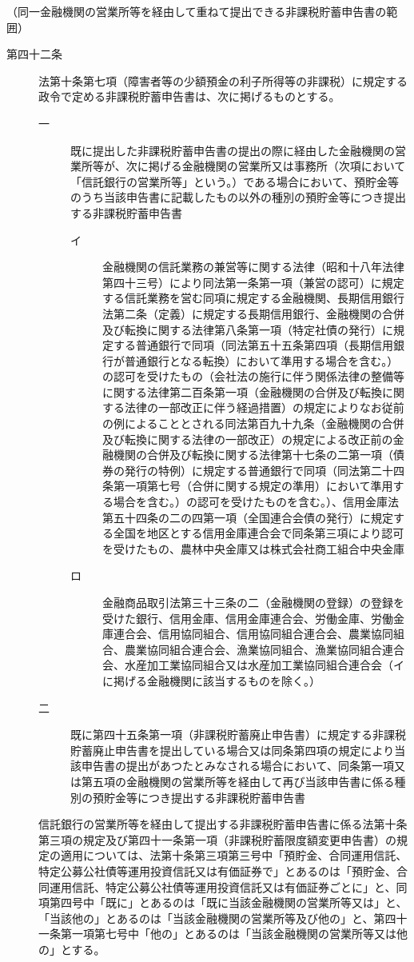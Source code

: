 \documentclass[twocolumn,a4j,10pt]{ltjtarticle}
\begin{document}
\noindent\hspace{10pt}（同一金融機関の営業所等を経由して重ねて提出できる非課税貯蓄申告書の範囲）
\begin{description}
\item[第四十二条]法第十条第七項（障害者等の少額預金の利子所得等の非課税）に規定する政令で定める非課税貯蓄申告書は、次に掲げるものとする。
\begin{description}
\item[一]既に提出した非課税貯蓄申告書の提出の際に経由した金融機関の営業所等が、次に掲げる金融機関の営業所又は事務所（次項において「信託銀行の営業所等」という。）である場合において、預貯金等のうち当該申告書に記載したもの以外の種別の預貯金等につき提出する非課税貯蓄申告書
\begin{description}
\item[イ]金融機関の信託業務の兼営等に関する法律（昭和十八年法律第四十三号）により同法第一条第一項（兼営の認可）に規定する信託業務を営む同項に規定する金融機関、長期信用銀行法第二条（定義）に規定する長期信用銀行、金融機関の合併及び転換に関する法律第八条第一項（特定社債の発行）に規定する普通銀行で同項（同法第五十五条第四項（長期信用銀行が普通銀行となる転換）において準用する場合を含む。）の認可を受けたもの（会社法の施行に伴う関係法律の整備等に関する法律第二百条第一項（金融機関の合併及び転換に関する法律の一部改正に伴う経過措置）の規定によりなお従前の例によることとされる同法第百九十九条（金融機関の合併及び転換に関する法律の一部改正）の規定による改正前の金融機関の合併及び転換に関する法律第十七条の二第一項（債券の発行の特例）に規定する普通銀行で同項（同法第二十四条第一項第七号（合併に関する規定の準用）において準用する場合を含む。）の認可を受けたものを含む。）、信用金庫法第五十四条の二の四第一項（全国連合会債の発行）に規定する全国を地区とする信用金庫連合会で同条第三項により認可を受けたもの、農林中央金庫又は株式会社商工組合中央金庫
\item[ロ]金融商品取引法第三十三条の二（金融機関の登録）の登録を受けた銀行、信用金庫、信用金庫連合会、労働金庫、労働金庫連合会、信用協同組合、信用協同組合連合会、農業協同組合、農業協同組合連合会、漁業協同組合、漁業協同組合連合会、水産加工業協同組合又は水産加工業協同組合連合会（イに掲げる金融機関に該当するものを除く。）
\end{description}
\item[二]既に第四十五条第一項（非課税貯蓄廃止申告書）に規定する非課税貯蓄廃止申告書を提出している場合又は同条第四項の規定により当該申告書の提出があつたとみなされる場合において、同条第一項又は第五項の金融機関の営業所等を経由して再び当該申告書に係る種別の預貯金等につき提出する非課税貯蓄申告書
\end{description}
\item[]信託銀行の営業所等を経由して提出する非課税貯蓄申告書に係る法第十条第三項の規定及び第四十一条第一項（非課税貯蓄限度額変更申告書）の規定の適用については、法第十条第三項第三号中「預貯金、合同運用信託、特定公募公社債等運用投資信託又は有価証券で」とあるのは「預貯金、合同運用信託、特定公募公社債等運用投資信託又は有価証券ごとに」と、同項第四号中「既に」とあるのは「既に当該金融機関の営業所等又は」と、「当該他の」とあるのは「当該金融機関の営業所等及び他の」と、第四十一条第一項第七号中「他の」とあるのは「当該金融機関の営業所等又は他の」とする。
\end{description}
\end{document}
